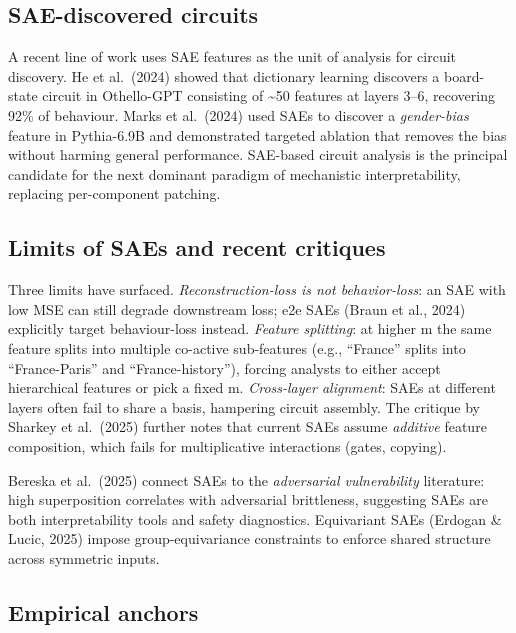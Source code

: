 \subsection{SAE-discovered circuits}\label{sae-discovered-circuits}

A recent line of work uses SAE features as the unit of analysis for circuit discovery. He et al.~(2024) showed that dictionary learning discovers a board-state circuit in Othello-GPT consisting of \textasciitilde50 features at layers 3--6, recovering 92\% of behaviour. Marks et al.~(2024) used SAEs to discover a \emph{gender-bias} feature in Pythia-6.9B and demonstrated targeted ablation that removes the bias without harming general performance. SAE-based circuit analysis is the principal candidate for the next dominant paradigm of mechanistic interpretability, replacing per-component patching.

\subsection{Limits of SAEs and recent critiques}\label{limits-of-saes-and-recent-critiques}

Three limits have surfaced. \emph{Reconstruction-loss is not behavior-loss}: an SAE with low MSE can still degrade downstream loss; e2e SAEs (Braun et al., 2024) explicitly target behaviour-loss instead. \emph{Feature splitting}: at higher m the same feature splits into multiple co-active sub-features (e.g., ``France'' splits into ``France-Paris'' and ``France-history''), forcing analysts to either accept hierarchical features or pick a fixed m. \emph{Cross-layer alignment}: SAEs at different layers often fail to share a basis, hampering circuit assembly. The critique by Sharkey et al.~(2025) further notes that current SAEs assume \emph{additive} feature composition, which fails for multiplicative interactions (gates, copying).

Bereska et al.~(2025) connect SAEs to the \emph{adversarial vulnerability} literature: high superposition correlates with adversarial brittleness, suggesting SAEs are both interpretability tools and safety diagnostics. Equivariant SAEs (Erdogan \& Lucic, 2025) impose group-equivariance constraints to enforce shared structure across symmetric inputs.

\subsection{Empirical anchors}\label{empirical-anchors}

